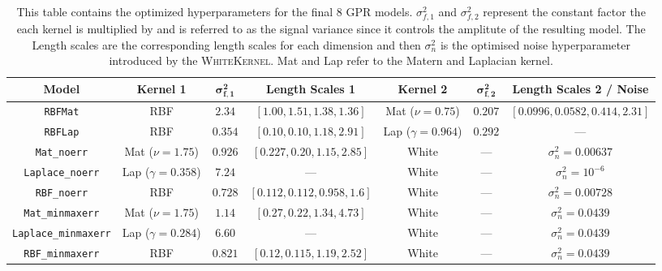 \documentclass{ucdgradtaughtthesis}
\begin{document}
\begin{table}[H]
\centering
\footnotesize  %
\renewcommand{\arraystretch}{1.15}  %
\setlength{\tabcolsep}{4pt}  %
{\fontsize{7}{8.5}\selectfont
\begin{tabular}{|c|c|c|c|c|c|c|}
\hline
\textbf{Model} & \textbf{Kernel 1} & $\mathbf{\sigma_{f,1}^2}$ & \textbf{Length Scales 1} & \textbf{Kernel 2} & $\mathbf{\sigma_{f,2}^2}$ & \textbf{Length Scales 2 / Noise} \\
\hline
\texttt{RBFMat} & RBF & $2.34$ & $[1.00, 1.51, 1.38, 1.36]$ & Mat ($\nu = 0.75$) & $0.207$ & $[0.0996, 0.0582, 0.414, 2.31]$ \\
\texttt{RBFLap} & RBF & $0.354$ & $[0.10, 0.10, 1.18, 2.91]$ & Lap ($\gamma = 0.964$) & $0.292$ & --- \\
\texttt{Mat\_noerr} & Mat ($\nu = 1.75$) & $0.926$ & $[0.227, 0.20, 1.15, 2.85]$ & White & --- & $\sigma_n^2 = 0.00637$ \\
\texttt{Laplace\_noerr} & Lap ($\gamma = 0.358$) & $7.24$ & --- & White & --- & $\sigma_n^2 = 10^{-6}$ \\
\texttt{RBF\_noerr} & RBF & $0.728$ & $[0.112, 0.112, 0.958, 1.6]$ & White & --- & $\sigma_n^2 = 0.00728$ \\
\texttt{Mat\_minmaxerr} & Mat ($\nu = 1.75$) & $1.14$ & $[0.27, 0.22, 1.34, 4.73]$ & White & --- & $\sigma_n^2 = 0.0439$ \\
\texttt{Laplace\_minmaxerr} & Lap ($\gamma = 0.284$) & $6.60$ & --- & White & --- & $\sigma_n^2 = 0.0439$ \\
\texttt{RBF\_minmaxerr} & RBF & $0.821$ & $[0.12, 0.115, 1.19, 2.52]$ & White & --- & $\sigma_n^2 = 0.0439$ \\
\hline
\end{tabular}}
\caption[The optimized hyperparameters for the final 8 GPR models.]{This table contains the optimized hyperparameters for the final 8 GPR models. $\sigma_{f,1}^2$ and $\sigma_{f,2}^2$ represent the constant factor the each kernel is multiplied by and is referred to as the signal variance since it controls the amplitute of the resulting model.
The Length scales are the corresponding length scales for each dimension and then $\sigma_n^2$ is the optimised noise hyperparameter introduced by the \textsc{WhiteKernel}. Mat and Lap refer to the Matern and Laplacian kernel.}
\label{tab:final_gpr_hyperparams}
\end{table}
\end{document}
